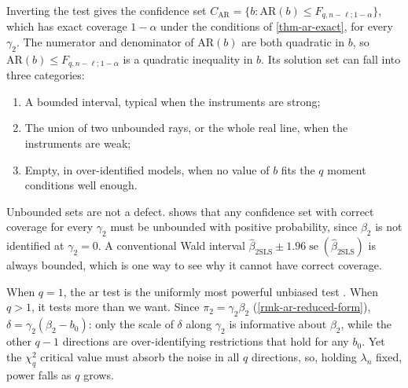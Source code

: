 \documentclass[a4paper,12pt]{article}
\begin{document}
\begin{remark}
	Inverting the test gives the confidence set $C_{\mathrm{AR}}=\{b:\mathrm{AR}(b)\le F_{q,n-\ell;1-\alpha}\}$,
	which has exact coverage $1-\alpha$ under the conditions of \autoref{thm-ar-exact}, for every $\gamma_2$.
	The numerator and denominator of $\mathrm{AR}(b)$ are both quadratic in $b$,
	so $\mathrm{AR}(b)\le F_{q,n-\ell;1-\alpha}$ is a quadratic inequality in $b$.
	Its solution set can fall into three categories:
	\begin{enumerate}
		\item A bounded interval, typical when the instruments are strong;
		\item The union of two unbounded rays, or the whole real line, when the instruments are weak;
		\item Empty, in over-identified models, when no value of $b$ fits the $q$ moment conditions well enough.
	\end{enumerate}
	Unbounded sets are not a defect.
	\textcite{dufour-1997} shows that any confidence set with correct coverage for every $\gamma_2$ must be unbounded with positive probability,
	since $\beta_2$ is not identified at $\gamma_2=0$.
	A conventional Wald interval $\widehat\beta_{\mathrm{2SLS}}\pm1.96\operatorname{se}(\widehat\beta_{\mathrm{2SLS}})$ is always bounded, which is one way to see why it cannot have correct coverage.
\end{remark}

\begin{remark}[Power]
	When $q=1$, the \gls{ar} test is the uniformly most powerful unbiased test \parencite{moreira-2009}.
	When $q>1$, it tests more than we want.
	Since $\pi_2=\gamma_2\beta_2$ (\autoref{rmk-ar-reduced-form}), $\delta=\gamma_2(\beta_2-b_0)$:
	only the scale of $\delta$ along $\gamma_2$ is informative about $\beta_2$,
	while the other $q-1$ directions are over-identifying restrictions that hold for any $b_0$.
	Yet the $\chi^2_q$ critical value must absorb the noise in all $q$ directions,
	so, holding $\lambda_n$ fixed, power falls as $q$ grows.
\end{remark}
\end{document}
